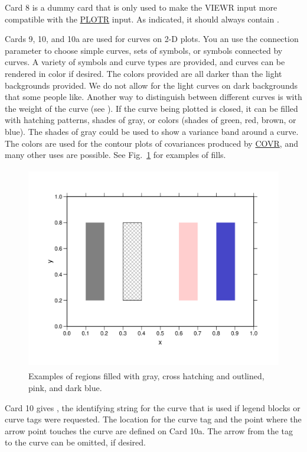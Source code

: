 Card 8 is a dummy card that is only used to make the VIEWR input
more compatible with the \hyperlink{sPLOTRhy}{PLOTR}
input.  As indicated, it should always contain .

Cards 9, 10, and 10a are used for curves on 2-D plots.  You an use
the  connection parameter to choose simple curves, sets of
symbols, or symbols connected by curves.  A variety of symbols and curve
types are provided, and curves can be rendered in color if desired.  The
colors provided are all darker than the light backgrounds provided.  We
do not allow for the light curves on dark backgrounds that some people
like.  Another way to distinguish between different curves is with the
weight of the curve (see ).  If the curve being plotted is
closed, it can be filled with hatching patterns, shades of gray, or
colors (shades of green, red, brown, or blue).  The shades of gray could
be used to show a variance band around a curve.  The colors are used
for the contour plots of covariances produced by
\hyperlink{sCOVRhy}{COVR}, and many other
uses are possible.  See Fig.~\ref{fills} for examples of fills.

\begin{figure}[t]\centering
\includegraphics[keepaspectratio, height=3.5in, angle=0]{figs/fillsack}
\caption[Sample region fill options in VIEWR]{Examples of regions filled
 with gray, cross hatching and outlined, pink, and dark blue.}
\label{fills}
\end{figure}

Card 10 gives , the identifying string
for the curve that is used if legend blocks or curve tags were requested.
The location for the curve tag and the point where the arrow point touches
the curve are defined on Card 10a.  The arrow from the tag to the curve
can be omitted, if desired.

